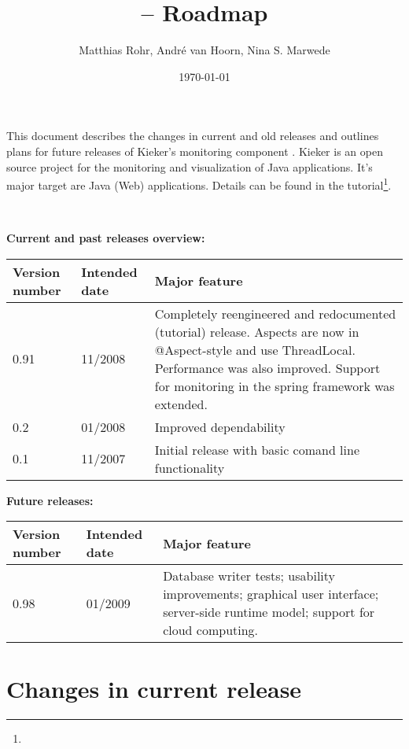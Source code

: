 \documentclass{scrartcl}
\title{\kieker -- Roadmap}
\date{\today \\ \kiekerurl{roadmap.pdf}}
\author{Matthias Rohr, Andr\'{e} van Hoorn, Nina S. Marwede}
\begin{document}
\maketitle
\noindent
This document describes the changes in current and old releases and outlines plans for future releases of Kieker's monitoring component \tpmon{}. Kieker is an open source project
for the monitoring and visualization of Java applications. It's major target are Java (Web) applications. Details can be found in the tutorial\footnote{\kiekertutorialurl}.

\

\noindent \large{\textbf{Current and past releases overview:}}
\begin{center}%
 \begin{tabular}{|l|l|p{8cm}|} \hline
\textbf{Version number} & \textbf{Intended date} & \textbf{Major feature} \\ \hline
0.91 & 11/2008 & Completely reengineered and redocumented (tutorial) release. Aspects are now in @Aspect-style and use ThreadLocal. Performance was also improved. Support for monitoring in the spring framework was extended.\\ \hline
0.2 & 01/2008 & Improved dependability \\ \hline
0.1 & 11/2007 & Initial release with basic comand line functionality \\ \hline
\end{tabular}
\end{center}

\noindent \large{\textbf{Future releases:}}
\begin{center}%
 \begin{tabular}{|l|l|p{8cm}|} \hline
\textbf{Version number} & \textbf{Intended date} & \textbf{Major feature} \\ \hline
0.98 & 01/2009 & Database writer tests; usability improvements; graphical user interface; server-side runtime model; support for cloud computing.\\ \hline
\end{tabular}
\end{center}



\section{Changes in current release}
\end{document}

